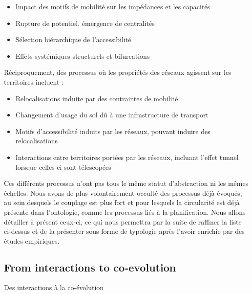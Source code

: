 \begin{itemize}
	\item Impact des motifs de mobilité sur les impédances et les capacités
	\item Rupture de potentiel, émergence de centralités
	\item Sélection hiérarchique de l'accessibilité
	\item Effets systémiques structurels et bifurcations
\end{itemize}

Réciproquement, des processus où les propriétés des réseaux agissent sur les territoires incluent :
\begin{itemize}
	\item Relocalisations induite par des contraintes de mobilité
	\item Changement d'usage du sol dû à une infrastructure de transport
    \item Motifs d'accessibilité induits par les réseaux, pouvant induire des relocalisations
	\item Interactions entre territoires portées par les réseaux, incluant l'effet tunnel lorsque celles-ci sont télescopées
	
	
\end{itemize}

Ces différents processus n'ont pas tous le même statut d'abstraction ni les mêmes échelles. Nous avons de plus volontairement occulté des processus déjà évoqués, au sein desquels le couplage est plus fort et pour lesquels la circularité est déjà présente dans l'ontologie, comme les processus liés à la planification. Nous allons détailler à présent ceux-ci, ce qui nous permettra par la suite de raffiner la liste ci-dessus et de la présenter sous forme de typologie après l'avoir enrichie par des études empiriques.



\subsection{From interactions to co-evolution}{Des interactions à la co-évolution}


